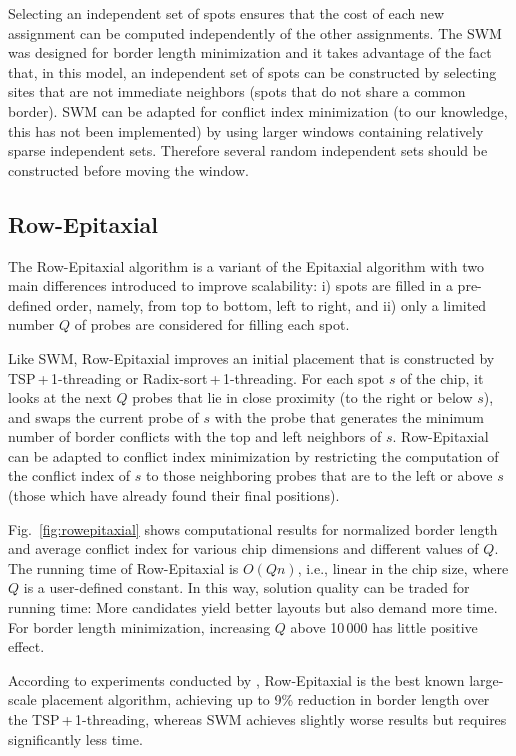 \documentclass{w-edbk}
\begin{document}
Selecting an independent set of spots ensures that the cost of each
new assignment can be computed independently of the other assignments.
The SWM was designed for border length minimization and it takes
advantage of the fact that, in this model, an independent set of spots
can be constructed by selecting sites that are not immediate
neighbors (spots that do not share a common border).
SWM can be adapted for conflict index minimization (to our knowledge,
this has not been implemented) by using larger windows containing
relatively sparse independent sets. Therefore several random
independent sets should be constructed before moving the window.


\subsection{Row-Epitaxial}

The Row-Epitaxial algorithm is a variant of the Epitaxial algorithm
with two main differences introduced to improve scalability: i) spots
are filled in a pre-defined order, namely, from top to bottom, left to
right, and ii) only a limited number $Q$ of probes are considered
for filling each spot.

Like SWM, Row-Epitaxial improves an initial placement that is
constructed by TSP\,+\,1-threading or Radix-sort\,+\,1-threading. For
each spot $s$ of the chip, it looks at the next $Q$ probes that lie in
close proximity (to the right or below $s$), and swaps the current
probe of $s$ with the probe that generates the minimum number of
border conflicts with the top and left neighbors of $s$.
Row-Epitaxial can be adapted to conflict index minimization by
restricting the computation of the conflict index of $s$ to those
neighboring probes that are to the left or above $s$ (those which have
already found their final positions).

Fig.~\ref{fig:rowepitaxial} shows computational results for normalized border
length and average conflict index for various chip dimensions and different
values of $Q$.  The running time of Row-Epitaxial is $O(Qn)$, i.e., linear in
the chip size, where $Q$ is a user-defined constant.  In this way, solution
quality can be traded for running time: More candidates yield better layouts
but also demand more time.  For border length minimization, increasing $Q$
above 10\,000 has little positive effect.

According to experiments conducted by \citet{Kahng2003},
Row-Epitaxial is the best known large-scale placement algorithm,
achieving up to 9\% reduction in border length over the
TSP\,+\,1-threading, whereas SWM achieves slightly worse results but
requires significantly less time.
\end{document}
